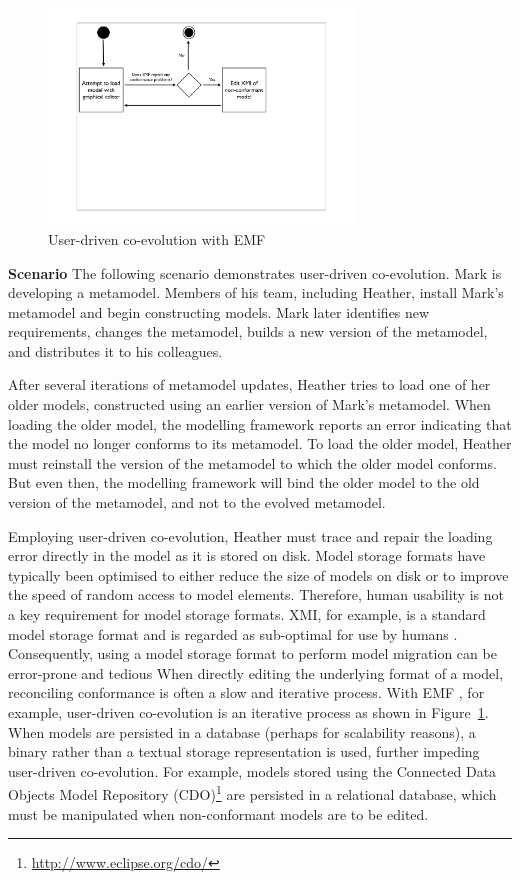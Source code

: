 \begin{figure}[htbp]
	\centering
		\includegraphics*[viewport=80 280 600 550,height=5.75cm]{6.Evaluation/images/user_driven/emf_process.pdf}
	\caption{User-driven co-evolution with EMF}
	\label{fig:emf_process_analysis}
\end{figure}

\begin{framed}
\textbf{Scenario}
The following scenario demonstrates user-driven co-evolution. Mark is developing a metamodel. Members of his team, including Heather, install Mark's metamodel and begin constructing models. Mark later identifies new requirements, changes the metamodel, builds a new version of the metamodel, and distributes it to his colleagues.

After several iterations of metamodel updates, Heather tries to load one of her older models, constructed using an earlier version of Mark's metamodel. When loading the older model, the modelling framework reports an error indicating that the model no longer conforms to its metamodel. To load the older model, Heather must reinstall the version of the metamodel to which the older model conforms. But even then, the modelling framework will bind the older model to the old version of the metamodel, and not to the evolved metamodel.

Employing user-driven co-evolution, Heather must trace and repair the loading error directly in the model as it is stored on disk. Model storage formats have typically been optimised to either reduce the size of models on disk or to improve the speed of random access to model elements. Therefore, human usability is not a key requirement for model storage formats. XMI, for example, is a standard model storage format and is regarded as sub-optimal for use by humans \cite{hutn}. Consequently, using a model storage format to perform model migration can be error-prone and tedious When directly editing the underlying format of a model, reconciling conformance is often a slow and iterative process. With EMF \cite{steinberg09emf}, for example, user-driven co-evolution is an iterative process as shown in Figure~\ref{fig:emf_process_analysis}. When models are persisted in a database (perhaps for scalability reasons), a binary rather than a textual storage representation is used, further impeding user-driven co-evolution. For example, models stored using the Connected Data Objects Model Repository (CDO)\footnote{\url{http://www.eclipse.org/cdo/}} are persisted in a relational database, which must be manipulated when non-conformant models are to be edited.
\end{framed}

